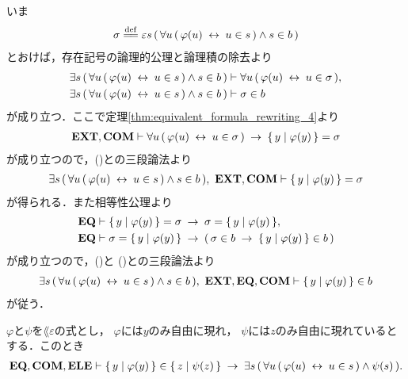 	\begin{sketch}
		いま
		\begin{align}
			\sigma \defeq \varepsilon s\, (\, \forall u\, (\, \varphi(u) \lrarrow u \in s\, ) \wedge s \in b\, )
		\end{align}
		とおけば，存在記号の論理的公理と論理積の除去より
		\begin{align}
			\exists s\, (\, \forall u\, (\, \varphi(u) \hspace{0.25em}\leftrightarrow\hspace{0.25em} u \in s\, ) \wedge s \in b\, )
			&\vdash \forall u\, (\, \varphi(u) \hspace{0.25em}\leftrightarrow\hspace{0.25em} u \in \sigma\, ), 
			\label{fom:equivalent_formula_rewriting_10_1} \\
			\exists s\, (\, \forall u\, (\, \varphi(u) \hspace{0.25em}\leftrightarrow\hspace{0.25em} u \in s\, ) \wedge s \in b\, )
			&\vdash \sigma \in b
			\label{fom:equivalent_formula_rewriting_10_2}
		\end{align}
		が成り立つ．ここで定理\ref{thm:equivalent_formula_rewriting_4}より
		\begin{align}
			\mbox{{\bf EXT}},\mbox{\bf COM} \vdash \forall u\, (\, \varphi(u) \hspace{0.25em}\leftrightarrow\hspace{0.25em} u \in \sigma\, )
			\hspace{0.25em}\rightarrow\hspace{0.25em} \{\, y \mid \varphi(y)\, \} = \sigma
		\end{align}
		が成り立つので，()との三段論法より
		\begin{align}
			\exists s\, (\, \forall u\, (\, \varphi(u) \hspace{0.25em}\leftrightarrow\hspace{0.25em} u \in s\, ) \wedge s \in b\, ),\ \mbox{{\bf EXT}},\mbox{\bf COM} \vdash \{\, y \mid \varphi(y)\, \} = \sigma
			\label{fom:equivalent_formula_rewriting_10_3}
		\end{align}
		が得られる．また相等性公理より
		\begin{align}
			\mbox{{\bf EQ}} &\vdash \{\, y \mid \varphi(y)\, \} = \sigma \hspace{0.25em}\rightarrow\hspace{0.25em} \sigma = \{\, y \mid \varphi(y)\, \}, \\
			\mbox{{\bf EQ}} &\vdash \sigma = \{\, y \mid \varphi(y)\, \} \hspace{0.25em}\rightarrow\hspace{0.25em}
			(\, \sigma \in b \hspace{0.25em}\rightarrow\hspace{0.25em} \{\, y \mid \varphi(y)\, \} \in b\, )
		\end{align}
		が成り立つので，()と
		()との三段論法より
		\begin{align}
			\exists s\, (\, \forall u\, (\, \varphi(u) \hspace{0.25em}\leftrightarrow\hspace{0.25em} u \in s\, ) \wedge s \in b\, ),\ \mbox{{\bf EXT}},\mbox{{\bf EQ}},\mbox{\bf COM} \vdash \{\, y \mid \varphi(y)\, \} \in b
		\end{align}
		が従う．
		\QED
	\end{sketch}
	
	\begin{screen}
		\begin{thm}
		\label{thm:equivalent_formula_rewriting_11}
			$\varphi$と$\psi$を$\lang{\varepsilon}$の式とし，
			$\varphi$には$y$のみ自由に現れ，
			$\psi$には$z$のみ自由に現れているとする．このとき
			\begin{align}
				\mbox{{\bf EQ}},\mbox{\bf COM},\mbox{{\bf ELE}} \vdash \{\, y \mid \varphi(y)\, \} \in \{\, z \mid \psi(z)\, \}
				\hspace{0.25em}\rightarrow\hspace{0.25em} \exists s\, (\, 
				\forall u\, (\, \varphi(u) \hspace{0.25em}\leftrightarrow\hspace{0.25em} u \in s\, )
				\wedge \psi(s)\, ).
			\end{align}
		\end{thm}
	\end{screen}
	

